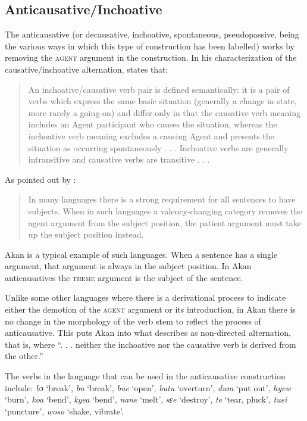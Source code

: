 \documentclass[output=paper]{langsci/langscibook}
\begin{document}
\subsection{Anticausative/Inchoative}\label{§4.3:anticausative.osam}

The anticausative (or decausative, inchoative, spontaneous, pseudopassive, being the various ways in which this type of construction has been labelled) works by removing the \textsc{agent} argument in the construction. In his characterization of the causative/inchoative alternation, \citeauthor{haspelmath1993} states that:

\begin{quote}
An inchoative/causative verb pair is defined semantically: it is a pair of verbs which express the same basic situation (generally a change in state, more rarely a going-on) and differ only in that the causative verb meaning includes an Agent participant who causes the situation, whereas the inchoative verb meaning excludes a causing Agent and presents the situation as occurring spontaneously . . . Inchoative verbs are generally intransitive and causative verbs are transitive . . . \citep[90]{haspelmath1993}
\end{quote}

As pointed out by \citet[1132]{haspelmathmuellerbardey2004}: 

\begin{quote}
In many languages there is a strong requirement for all sentences to have subjects. When in such languages a valency-changing category removes the agent argument from the subject position, the patient argument must take up the subject position instead.
\end{quote}

Akan is a typical example of such languages. When a sentence has a single argument, that argument is always in the subject position. In Akan anticausatives the \textsc{theme} argument is the subject of the sentence. 

Unlike some other languages where there is a derivational process to indicate either the demotion of the \textsc{agent} argument or its introduction, in Akan there is no change in the morphology of the verb stem to reflect the process of anticausative. This puts Akan into what \citet[91]{haspelmath1993} describes as non-directed alternation, that is, where ``. . . neither the inchoative nor the causative verb is derived from the other.''

The verbs in the language that can be used in the anticausative construction include: \textit{bɔ} `break', \textit{bu} `break', \textit{bue} `open', \textit{butu} `overturn', \textit{dum} `put out', \textit{hyew} `burn', \textit{koa} `bend', \textit{kyea} `bend', \textit{nane} `melt', \textit{sɛe} `destroy', \textit{te} `tear, pluck', \textit{tuei} `puncture', \textit{woso} `shake, vibrate'. 
\end{document}
